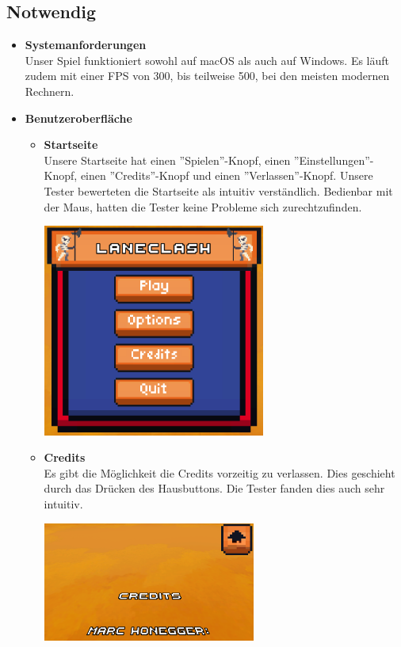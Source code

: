 \subsection{Notwendig}
    \begin{itemize}
    \item \textbf{Systemanforderungen} \\
        Unser Spiel funktioniert sowohl auf macOS als auch auf Windows. Es läuft zudem mit einer FPS von 300, bis teilweise 500, bei den meisten modernen Rechnern.
    \item \textbf{Benutzeroberfläche} \\
    \begin {itemize}
        \item \textbf{Startseite} \\
            Unsere Startseite hat einen ''Spielen''-Knopf, einen ''Einstellungen''-Knopf, einen ''Credits''-Knopf und einen ''Verlassen''-Knopf. Unsere Tester bewerteten die Startseite
            als intuitiv verständlich. Bedienbar mit der Maus, hatten die Tester keine Probleme sich zurechtzufinden.
            \begin{center}
                \includegraphics[height=7cm]{resources/laneclash.png}\\
            \end{center}

        \item \textbf{Credits}\\
            Es gibt die Möglichkeit die Credits vorzeitig zu verlassen. Dies geschieht durch das Drücken des Hausbuttons. Die Tester fanden dies auch sehr intuitiv.
            \begin{center}
                \includegraphics*[width = 7cm]{resources/credits.png}\\
            \end{center}
            

\end{itemize}
\end{itemize}
